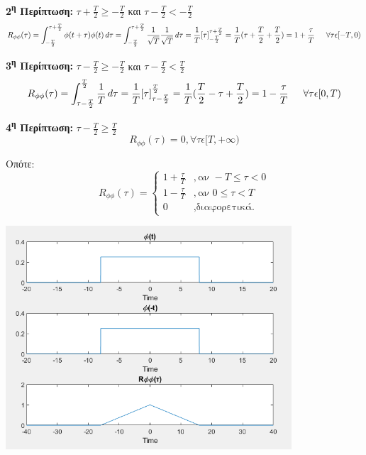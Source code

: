 \begin{justify}
{\bf 2\textsuperscript{η} Περίπτωση:}  $\tau+\frac{T}{2}\geq -\frac{T}{2}$ και 
$\tau-\frac{T}{2}< -\frac{T}{2}$ 
\[
R_{\phi\phi}(\tau)=\int_{-\frac{T}{2}}^{\tau+\frac{T}{2}} \phi(t+\tau)\phi(t)\,d\tau =
\int_{-\frac{T}{2}}^{\tau+\frac{T}{2}} \frac{1}{\sqrt{T}}\frac{1}{\sqrt{T}}\,d\tau =
\frac{1}{T}[\tau]_{-\frac{T}{2}}^{\tau+\frac{T}{2}}
= \frac{1}{T}(\tau+\frac{T}{2}+\frac{T}{2})=1+\frac{\tau}{T} \hspace{1.5em} \forall\tau\epsilon[-T,0)\]
\end{justify}

\begin{justify}
{\bf 3\textsuperscript{η} Περίπτωση:} $\tau-\frac{T}{2}\geq -\frac{T}{2}$ και 
$\tau-\frac{T}{2}< \frac{T}{2}$ 
\[
R_{\phi\phi}(\tau)=\int_{\tau-\frac{T}{2}}^{\frac{T}{2}} \frac{1}{T}\,d\tau = 
\frac{1}{T}[\tau]_{\tau-\frac{T}{2}}^{\frac{T}{2}} = \frac{1}{T}(\frac{T}{2}-\tau+\frac{T}{2})
=1-\frac{\tau}{T} \hspace{1.5em} \forall\tau\epsilon[0,T)
\]
\end{justify}

\begin{justify}
{\bf 4\textsuperscript{η} Περίπτωση:}  $\tau-\frac{T}{2}\geq\frac{T}{2}$
\[
R_{\phi\phi}(\tau)=0, \forall \tau \epsilon [T,+\infty)      
\]
\end{justify}

\newpage

\begin{justify}
Οπότε:
\[
R_{\phi\phi}(\tau)= 
\left\{
	\begin{array}{lll}
		1+\frac{\tau}{T} &, \mbox{αν } -T \leq \tau < 0 \\
        1-\frac{\tau}{T} &, \mbox{αν } 0 \leq \tau < T \\
		0 &, \mbox{διαφορετικά.}
	\end{array}
\right.
\]
\end{justify}

\begin{center}
    \centering
    \includegraphics[width=0.8\textwidth]{THETA/Images/theta.fig1.png} %
    \label{fig:third_image}
\end{center}


